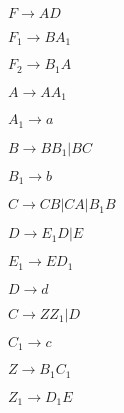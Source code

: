\begin{question}
\begin{enumerate}[label=\textbf{\alph*})]
        $F \rightarrow AD $

        $F_1 \rightarrow BA_1 $

        $F_2 \rightarrow B_1A $
  
        $A \rightarrow AA_1 $

        $A_1 \rightarrow a $
    
        $B \rightarrow BB_1 | BC $

        $B_1 \rightarrow b $

        $C \rightarrow CB | CA | B_1B $

        $D \rightarrow E_1D | E $

        $E_1 \rightarrow ED_1 $

        $D \rightarrow d $

        $C \rightarrow ZZ_1 | D $ 

        $C_1 \rightarrow c $

        $Z \rightarrow B_1C_1 $

        $Z_1 \rightarrow D_1E $

    \end{enumerate}

\end{question}

